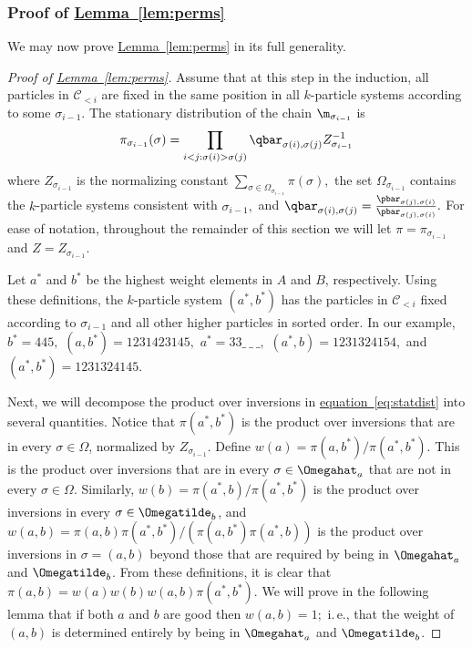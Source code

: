 \documentclass[11pt]{article}
\providecommand{\ie}{i.\,e.}
\providecommand{\expref}[2]{\texorpdfstring{\hyperref[#2]{#1~\ref{#2}}}{#1~\ref{#2}}}
\providecommand{\expeqref}[2]{\texorpdfstring{\hyperref[#2]{#1~\eqref{#2}}}{#1~\eqref{#2}}}
\begin{document}
\subsubsection{Proof of \expref{Lemma}{lem:perms}}
We may now prove \expref{Lemma}{lem:perms} in its full generality.\\

%
\begin{proof}[Proof of \expref{Lemma}{lem:perms}]   %
Assume that at this step in the induction, all particles in 
$\mathcal{C}_{< i}$ are fixed in the same position in all $k$-particle 
systems according to some $\sigma_{i-1}.$  The stationary distribution 
of the chain $\m_{\sigma_{i-1}}$ is $$\pi_{\sigma_{i-1}}(\sigma) =  
\prod_{i < j: \sigma(i) > \sigma(j)}\qbar_{\sigma(i), 
\sigma(j)}Z_{\sigma_{i-1}}^{-1}$$  
where $Z_{\sigma_{i-1}}$ is the normalizing constant $\sum_{\sigma \in 
\Omega_{\sigma_{i-1}}} \pi(\sigma),$ the set $\Omega_{\sigma_{i-1}}$ 
contains the $k$-particle systems consistent with $\sigma_{i-1},$ and 
$\qbar_{\sigma(i), 
\sigma(j)}=\frac{\pbar_{\sigma(j),\sigma(i)}}{\pbar_{\sigma(j),\sigma(i)}}.$  
For ease of notation, throughout the remainder of this section we will 
let $\pi = \pi_{\sigma_{i-1}}$ and $Z =Z_{\sigma_{i-1}}$.

Let $a^*$ and $b^*$ be the highest weight elements in $A$ and $B$, 
respectively.  Using these definitions, the $k$-particle system 
$(a^*,b^*)$ has the particles in $\mathcal{C}_{< i}$ fixed according to 
$\sigma_{i-1}$ and all other higher particles in sorted order.   In our 
example, $b^* = 445,$ $(a,b^*) = 1231423145,$ $a^* = 33\_\ \_\ \_,$ 
$(a^*,b) = 1231324154,$ and $(a^*,b^*) = 1231324145.$ 

Next, we will decompose the product over inversions in 
\expeqref{equation}{eq:statdist} into several quantities. Notice that 
$\pi(a^*,b^*)$ is the product over inversions that are in every 
$\sigma\in\Omega$, normalized by $Z_{\sigma_{i-1}}$.  Define $w(a) = 
\pi(a,b^*)/\pi(a^*,b^*).$  This is the product over inversions that are 
in every $\sigma\in\Omegahat_a$ that are not in every 
$\sigma\in\Omega$. Similarly, $w(b) = \pi(a^*,b)/\pi(a^*,b^*)$ is the 
product over inversions in every $\sigma\in\Omegatilde_b$, and $w(a,b) 
= \pi(a,b) \pi(a^*,b^*)/ (\pi(a,b^*)\pi(a^*,b))$ is the product over 
inversions in $\sigma=(a,b)$ beyond those that are required by being in 
$\Omegahat_a$ and $\Omegatilde_b$.  From these definitions, it is clear 
that $\pi(a,b) = w(a)w(b) w(a,b)\pi(a^*,b^*).$  We will prove in the 
following lemma that if both $a$ and $b$ are good then $w(a,b) = 1;$ 
\ie,  that the weight of $(a,b)$ is determined entirely by being in 
$\Omegahat_a$ and $\Omegatilde_b$.


\end{proof}
\end{document}
